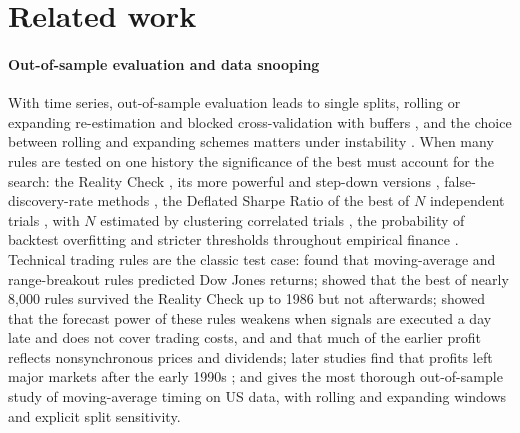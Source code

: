 \documentclass[pdflatex,sn-basic]{sn-jnl}
\theoremstyle{thmstyleone}
\theoremstyle{thmstylethree}
\begin{document}
\section{Related work}\label{sec:related}

\paragraph{Out-of-sample evaluation and data snooping} With time series, out-of-sample evaluation
leads to single splits, rolling or expanding re-estimation and blocked cross-validation with buffers
\citep{tashman2000,burman1994,racine2000,bergmeir2012,bergmeir2018,cerqueira2020,hewamalage2023,lopezdeprado2018},
and the choice between rolling and expanding schemes matters under instability
\citep{west1996,clark2001,giacomini2006,pesaran2007,inoue2017,rossi2021}. When many rules are tested
on one history the significance of the best must account for the search: the Reality Check
\citep{white2000}, its more powerful and step-down versions \citep{hansen2005,romano2005,hsu2010},
false-discovery-rate methods \citep{benjamini1995,bajgrowicz2012,harvey2020raps}, the Deflated Sharpe
Ratio of the best of $N$ independent trials \citep{bailey2014dsr}, with $N$ estimated by clustering
correlated trials \citep{lopezdeprado2019}, the probability of backtest overfitting \citep{bailey2017}
and stricter thresholds throughout empirical finance \citep{harvey2016,harvey2020jf}. Technical trading
rules are the classic test case: \citet{brock1992} found that moving-average and range-breakout rules
predicted Dow Jones returns; \citet{sullivan1999} showed that the best of nearly 8,000 rules survived
the Reality Check up to 1986 but not afterwards; \citet{bessembinder1998} showed that the forecast power
of these rules weakens when signals are executed a day late and does not cover trading costs, and
\citet{day2002} and \citet{ready2002} that much of the earlier profit reflects nonsynchronous prices and
dividends; later studies find that profits left major markets after the early 1990s
\citep{hsu2005,park2007,bajgrowicz2012,taylor2014,hsu2016}; and \citet{zakamulin2014,zakamulin2017}
gives the most thorough out-of-sample study of moving-average timing on US data, with rolling and
expanding windows and explicit split sensitivity.
\end{document}
